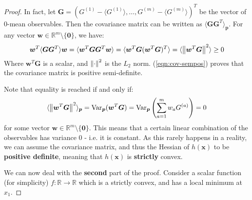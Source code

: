 \documentclass[../template.tex]{subfiles}
\begin{document}
\begin{proof}
\medskip

In fact, let $\bm{G} = (G^{(1)} - \langle G^{(1)} \rangle, \dots, G^{(m)}- \langle G^{(m)} \rangle)^T$ be the vector of $0$-mean observables. Then the covariance matrix can be written as $\langle \bm{G} \bm{G}^T  \rangle_{\bm{p}}$. For any vector $\bm{w} \in \mathbb{R}^m \setminus \{\bm{0}\}$, we have:
\begin{align}\label{eqn:cov-sempos}
    \bm{w}^T \langle \bm{G} \bm{G}^T \rangle \bm{w} = \langle \bm{w}^T \bm{G} \bm{G}^T \bm{w} \rangle = \langle \bm{w}^T \bm{G} (\bm{w}^T \bm{G})^T \rangle = \langle \norm{\bm{w}^T \bm{G}}^2 \rangle \geq 0 
\end{align}
Where $\bm{w}^T \bm{G}$ is a scalar, and $\norm{\cdot}^2$ is the $L_2$ norm. (\ref{eqn:cov-sempos}) proves that the covariance matrix is positive semi-definite.

\medskip

Note that equality is reached if and only if:
\begin{align*}
    \langle \norm{\bm{w}^T \bm{G}}^2 \rangle_{\bm{p}} = \operatorname{Var}_{\bm{p}}(\bm{w}^T \bm{G}) = \operatorname{Var}_{\bm{p}}\left(\sum_{a=1}^m w_a G^{(a)}\right) = 0
\end{align*}
for some vector $\bm{w} \in \mathbb{R}^m \setminus \{\bm{0}\}$. This means that a certain linear combination of the observables has variance $0$ - i.e. it is constant. As this rarely happens in a reality, we can assume the covariance matrix, and thus the Hessian of $h(\bm{x})$ to be \textbf{positive definite}, meaning that $h(\bm{x})$ is \textbf{strictly} convex.  

    \medskip

    We can now deal with the \textbf{second} part of the proof. Consider a scalar function (for simplicity) $f\colon \mathbb{R} \to \mathbb{R}$ which is a strictly convex, and has a local minimum at $x_1$. 


\end{proof}
\end{document}
